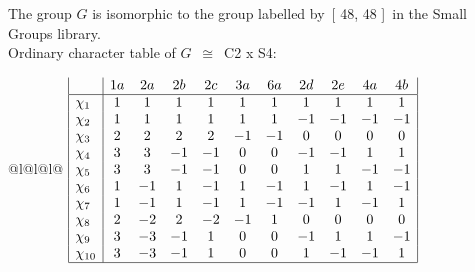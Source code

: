\documentclass[varwidth=\maxdimen,border=10]{standalone}
\begin{document}
The group $G$ is isomorphic to the group labelled by\ [ 48, 48 ]\ in the Small Groups library.\\
Ordinary character table of $G$\ $\cong$\ C2 x S4:\\
\begin{center}
\begin{tabular}{@{}l@{}l@{}l@{}}
\hline
\(\begin{array}{|l|cccccccccc|}
  & 1a & 2a & 2b & 2c & 3a & 6a & 2d & 2e & 4a & 4b\\ \hline
\chi_{1} & 1 & 1 & 1 & 1 & 1 & 1 & 1 & 1 & 1 & 1\\
\chi_{2} & 1 & 1 & 1 & 1 & 1 & 1 & -1 & -1 & -1 & -1\\
\chi_{3} & 2 & 2 & 2 & 2 & -1 & -1 & 0 & 0 & 0 & 0\\
\chi_{4} & 3 & 3 & -1 & -1 & 0 & 0 & -1 & -1 & 1 & 1\\
\chi_{5} & 3 & 3 & -1 & -1 & 0 & 0 & 1 & 1 & -1 & -1\\
\chi_{6} & 1 & -1 & 1 & -1 & 1 & -1 & 1 & -1 & 1 & -1\\
\chi_{7} & 1 & -1 & 1 & -1 & 1 & -1 & -1 & 1 & -1 & 1\\
\chi_{8} & 2 & -2 & 2 & -2 & -1 & 1 & 0 & 0 & 0 & 0\\
\chi_{9} & 3 & -3 & -1 & 1 & 0 & 0 & -1 & 1 & 1 & -1\\
\chi_{10} & 3 & -3 & -1 & 1 & 0 & 0 & 1 & -1 & -1 & 1\\
\hline
\end{array}\)\\
\end{tabular}
\end{center}
\end{document}
